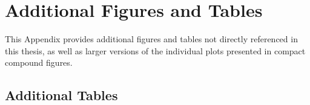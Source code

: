 

\chapter{Additional Figures and Tables}\label{ch:AdditionalData}
\glsresetall %

This Appendix provides additional figures and tables not directly referenced in this thesis, as well as larger versions of the individual plots presented in compact compound figures.

\section{Additional Tables}

